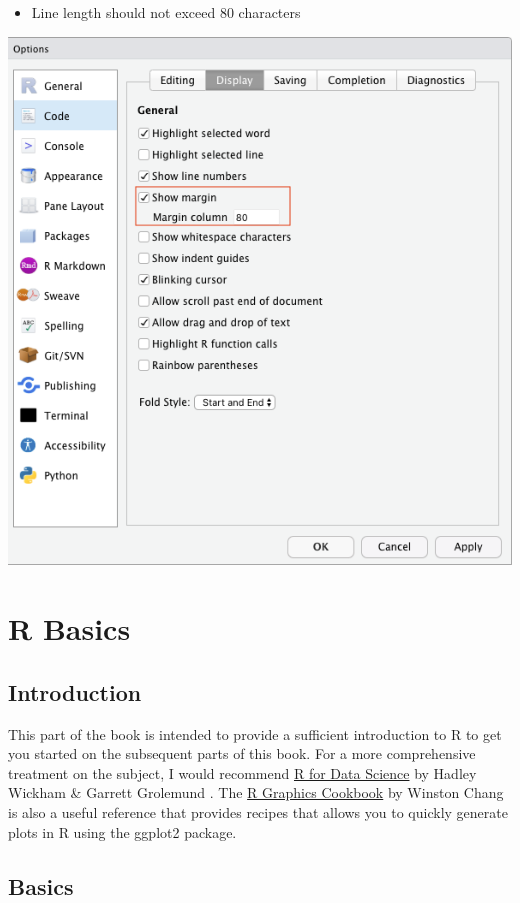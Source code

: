 \documentclass[
]{book}
\providecommand{\tightlist}{%
  \setlength{\itemsep}{0pt}\setlength{\parskip}{0pt}}
\begin{document}
\begin{itemize}
\tightlist
\item
  Line length should not exceed 80 characters
\end{itemize}

\begin{center}\includegraphics[width=0.7\linewidth]{figures/line_length} \end{center}

\hypertarget{part-r-basics}{%
\part{R Basics}\label{part-r-basics}}

\hypertarget{r-basics}{%
\chapter{Introduction}\label{r-basics}}

This part of the book is intended to provide a sufficient introduction to R to get you started on the subsequent parts of this book. For a more comprehensive treatment on the subject, I would recommend \href{https://r4ds.had.co.nz/index.html}{R for Data Science} by Hadley Wickham \& Garrett Grolemund \citep{wickham_r_2016}. The \href{https://r-graphics.org}{R Graphics Cookbook} by Winston Chang \citep{chang_r_2018} is also a useful reference that provides recipes that allows you to quickly generate plots in R using the ggplot2 package.

\hypertarget{basics}{%
\chapter{Basics}\label{basics}}
\end{document}
